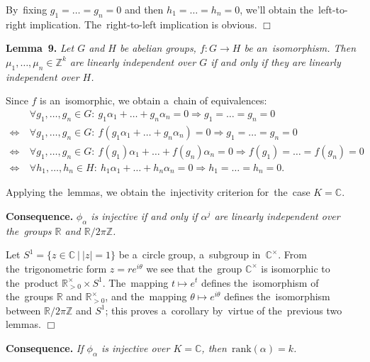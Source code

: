 \documentclass[twoside]{article}
\begin{document}
    By~fixing $g_1 = \ldots = g_n = 0$ and then $h_1 = \ldots = h_n = 0$, we'll obtain the~left-to-right
    implication. The~right-to-left implication is obvious.
\hfill$\Box$\medskip

\medskip\noindent\textbf{Lemma~9.}\emph{
    Let $G$ and $H$ be abelian groups, $f : G \rightarrow H$ be an~isomorphism. Then $\mu_1, \ldots, \mu_n \in \mathbb{Z}^k$
    are linearly independent over $G$ if and only if they are linearly independent over $H$.
}\medskip

    Since $f$ is an~isomorphic, we obtain a~chain of equivalences:
    \begin{align*}
                       &\ \forall g_1, \ldots, g_n \in G{:}\ g_1 \alpha_1 + \ldots + g_n \alpha_n = 0 \Rightarrow g_1 = \ldots = g_n = 0 \\
        \Leftrightarrow&\ \forall g_1, \ldots, g_n \in G{:}\ f(g_1 \alpha_1 + \ldots + g_n \alpha_n) = 0 \Rightarrow g_1 = \ldots = g_n = 0 \\
        \Leftrightarrow&\ \forall g_1, \ldots, g_n \in G{:}\ f(g_1) \alpha_1 + \ldots + f(g_n) \alpha_n = 0 \Rightarrow f(g_1) = \ldots = f(g_n) = 0 \\
        \Leftrightarrow&\ \forall h_1, \ldots, h_n \in H{:}\ h_1 \alpha_1 + \ldots + h_n \alpha_n = 0 \Rightarrow h_1 = \ldots = h_n = 0.
        \tag*{$\Box$}
    \end{align*}
{}

Applying the~lemmas, we obtain the~injectivity criterion for~the~case $K = \mathbb{C}$.

\medskip\noindent\textbf{Consequence.}\emph{
    $\phi_\alpha$ is injective if and only if $\alpha^j$ are linearly independent over the~groups $\mathbb{R}$ and $\mathbb{R} / 2 \pi \mathbb{Z}$.
}\medskip

    Let $S^1 = \{ z \in \mathbb{C}\ | \ |z| = 1 \}$ be a~circle group, a~subgroup in~${\mathbb{C}^\times}$.
    From the~trigonometric form $z = re^{i \theta}$ we see that the~group ${\mathbb{C}^\times}$ is isomorphic
    to the~product $\mathbb{R}_{> 0}^\times \times S^1$. The~mapping $t \mapsto e^t$ defines the~isomorphism
    of the~groups $\mathbb{R}$ and $\mathbb{R}_{> 0}^\times$, and the~mapping $\theta \mapsto e^{i\theta}$
    defines the~isomorphism between $\mathbb{R} / 2 \pi \mathbb{Z}$ and $S^1$; this proves a~corollary
    by~virtue of the~previous two lemmas.
\hfill$\Box$\medskip

\medskip\noindent\textbf{Consequence.}\emph{
    If $\phi_\alpha$ is injective over $K = \mathbb{C}$, then~$\mathrm{rank}(\alpha) = k$.
}\medskip
\end{document}
